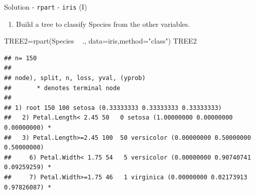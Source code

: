 \documentclass[
  10pt,
  ignorenonframetext,
]{beamer}
\newenvironment{Shaded}{}{}
\newcommand{\DataTypeTok}[1]{#1}
\newcommand{\KeywordTok}[1]{\textcolor[rgb]{0.00,0.00,1.00}{#1}}
\newcommand{\NormalTok}[1]{#1}
\newcommand{\OperatorTok}[1]{#1}
\newcommand{\StringTok}[1]{\textcolor[rgb]{0.00,0.50,0.50}{#1}}
\providecommand{\tightlist}{%
  \setlength{\itemsep}{0pt}\setlength{\parskip}{0pt}}
\begin{document}
\begin{frame}[fragile]{Solution - \texttt{rpart} - \texttt{iris} (I)}
\protect\hypertarget{solution---rpart---iris-i}{}

\begin{enumerate}
[1)]
\tightlist
\item
  Build a tree to classify Species from the other variables.
\end{enumerate}

\begin{Shaded}
\begin{Highlighting}[]
\NormalTok{TREE2=}\KeywordTok{rpart}\NormalTok{(Species }\OperatorTok{~}\StringTok{ }\NormalTok{., }\DataTypeTok{data=}\NormalTok{iris,}\DataTypeTok{method=}\StringTok{"class"}\NormalTok{)}
\NormalTok{TREE2}
\end{Highlighting}
\end{Shaded}

\begin{verbatim}
## n= 150 
## 
## node), split, n, loss, yval, (yprob)
##       * denotes terminal node
## 
## 1) root 150 100 setosa (0.33333333 0.33333333 0.33333333)  
##   2) Petal.Length< 2.45 50   0 setosa (1.00000000 0.00000000 0.00000000) *
##   3) Petal.Length>=2.45 100  50 versicolor (0.00000000 0.50000000 0.50000000)  
##     6) Petal.Width< 1.75 54   5 versicolor (0.00000000 0.90740741 0.09259259) *
##     7) Petal.Width>=1.75 46   1 virginica (0.00000000 0.02173913 0.97826087) *
\end{verbatim}

\end{frame}
\end{document}
